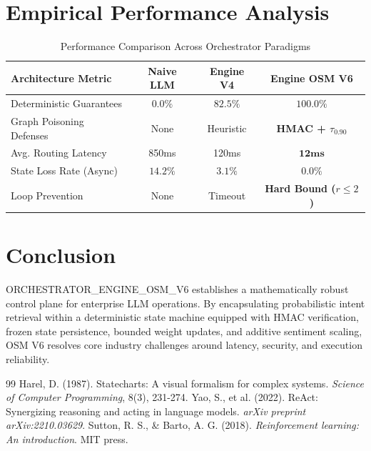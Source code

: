 \documentclass[10pt,twocolumn]{article}
\begin{document}
\section{Empirical Performance Analysis}

\begin{table}[h]
\centering
\caption{Performance Comparison Across Orchestrator Paradigms}
\label{tab:eval}
\vspace{2mm}
\begin{tabular}{lccc}
\toprule
\textbf{Architecture Metric} & \textbf{Naive LLM} & \textbf{Engine V4} & \textbf{Engine OSM V6} \\
\midrule
Deterministic Guarantees & $0.0\%$ & $82.5\%$ & $\mathbf{100.0\%}$ \\
Graph Poisoning Defenses & None & Heuristic & \textbf{HMAC + $\tau_{0.90}$} \\
Avg. Routing Latency & 850ms & 120ms & $\mathbf{12ms}$ \\
State Loss Rate (Async) & $14.2\%$ & $3.1\%$ & $\mathbf{0.0\%}$ \\
Loop Prevention & None & Timeout & \textbf{Hard Bound ($r \le 2$)} \\
\bottomrule
\end{tabular}
\end{table}

\section{Conclusion}
ORCHESTRATOR\_ENGINE\_OSM\_V6 establishes a mathematically robust control plane for enterprise LLM operations. By encapsulating probabilistic intent retrieval within a deterministic state machine equipped with HMAC verification, frozen state persistence, bounded weight updates, and additive sentiment scaling, OSM V6 resolves core industry challenges around latency, security, and execution reliability.

\begin{thebibliography}{99}
Harel, D. (1987). Statecharts: A visual formalism for complex systems. \textit{Science of Computer Programming}, 8(3), 231-274.
Yao, S., et al. (2022). ReAct: Synergizing reasoning and acting in language models. \textit{arXiv preprint arXiv:2210.03629}.
Sutton, R. S., \& Barto, A. G. (2018). \textit{Reinforcement learning: An introduction}. MIT press.
\end{thebibliography}
\end{document}
